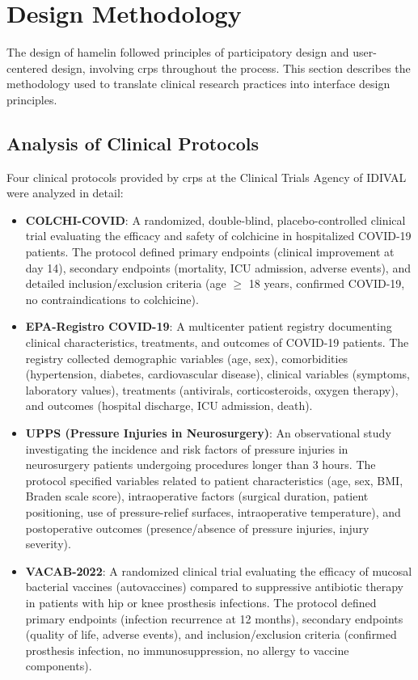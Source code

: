 \section{Design Methodology}  
\label{sec:design_methodology}  
  
The design of \gls{hamelin} followed principles of participatory design and user-centered design, involving \glspl{crp} throughout the process. This section describes the methodology used to translate clinical research practices into interface design principles.  
  
\subsection{Analysis of Clinical Protocols}  
\label{subsec:protocol_analysis}  
  
Four clinical protocols provided by \glspl{crp} at the Clinical Trials Agency of IDIVAL were analyzed in detail:  
  
\begin{itemize}  
    \item \textbf{COLCHI-COVID}: A randomized, double-blind, placebo-controlled clinical trial evaluating the efficacy and safety of colchicine in hospitalized COVID-19 patients. The protocol defined primary endpoints (clinical improvement at day 14), secondary endpoints (mortality, ICU admission, adverse events), and detailed inclusion/exclusion criteria (age $\geq$ 18 years, confirmed COVID-19, no contraindications to colchicine).  
      
    \item \textbf{EPA-Registro COVID-19}: A multicenter patient registry documenting clinical characteristics, treatments, and outcomes of COVID-19 patients. The registry collected demographic variables (age, sex), comorbidities (hypertension, diabetes, cardiovascular disease), clinical variables (symptoms, laboratory values), treatments (antivirals, corticosteroids, oxygen therapy), and outcomes (hospital discharge, ICU admission, death).  
      
    \item \textbf{UPPS (Pressure Injuries in Neurosurgery)}: An observational study investigating the incidence and risk factors of pressure injuries in neurosurgery patients undergoing procedures longer than 3 hours. The protocol specified variables related to patient characteristics (age, sex, BMI, Braden scale score), intraoperative factors (surgical duration, patient positioning, use of pressure-relief surfaces, intraoperative temperature), and postoperative outcomes (presence/absence of pressure injuries, injury severity).  
      
    \item \textbf{VACAB-2022}: A randomized clinical trial evaluating the efficacy of mucosal bacterial vaccines (autovaccines) compared to suppressive antibiotic therapy in patients with hip or knee prosthesis infections. The protocol defined primary endpoints (infection recurrence at 12 months), secondary endpoints (quality of life, adverse events), and inclusion/exclusion criteria (confirmed prosthesis infection, no immunosuppression, no allergy to vaccine components).  
\end{itemize}  
  
